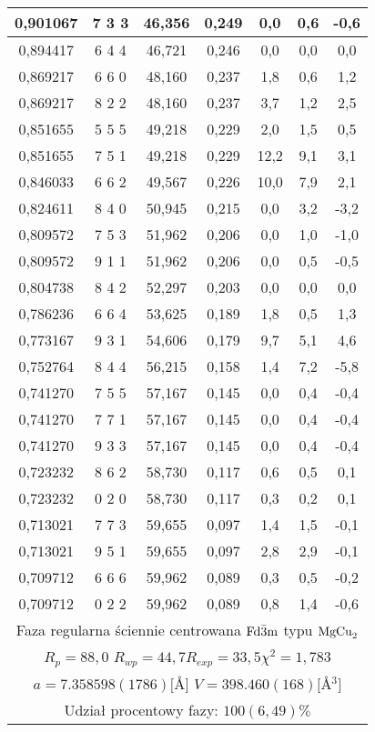 \documentclass[a4paper,12pt]{article}
\numberwithin{equation}{section}
\newcommand{\nit}[1]{\textnormal{#1}}
\begin{document}
\begin{appendices}
\begin{longtable}[c]{|c|c|c|c|c|c|c|}
0,901067	&	7   3   3	&	46,356	&	0,249	&	0,0	&	0,6	&	-0,6	\\\hline
0,894417	&	6   4   4	&	46,721	&	0,246	&	0,0	&	0,0	&	0,0	\\\hline
0,869217	&	6   6   0	&	48,160	&	0,237	&	1,8	&	0,6	&	1,2	\\\hline
0,869217	&	8   2   2	&	48,160	&	0,237	&	3,7	&	1,2	&	2,5	\\\hline
0,851655	&	5   5   5	&	49,218	&	0,229	&	2,0	&	1,5	&	0,5	\\\hline
0,851655	&	7   5   1	&	49,218	&	0,229	&	12,2	&	9,1	&	3,1	\\\hline
0,846033	&	6   6   2	&	49,567	&	0,226	&	10,0	&	7,9	&	2,1	\\\hline
0,824611	&	8   4   0	&	50,945	&	0,215	&	0,0	&	3,2	&	-3,2	\\\hline
0,809572	&	7   5   3	&	51,962	&	0,206	&	0,0	&	1,0	&	-1,0	\\\hline
0,809572	&	9   1   1	&	51,962	&	0,206	&	0,0	&	0,5	&	-0,5	\\\hline
0,804738	&	8   4   2	&	52,297	&	0,203	&	0,0	&	0,0	&	0,0	\\\hline
0,786236	&	6   6   4	&	53,625	&	0,189	&	1,8	&	0,5	&	1,3	\\\hline
0,773167	&	9   3   1	&	54,606	&	0,179	&	9,7	&	5,1	&	4,6	\\\hline
0,752764	&	8   4   4	&	56,215	&	0,158	&	1,4	&	7,2	&	-5,8	\\\hline
0,741270	&	7   5   5	&	57,167	&	0,145	&	0,0	&	0,4	&	-0,4	\\\hline
0,741270	&	7   7   1	&	57,167	&	0,145	&	0,0	&	0,4	&	-0,4	\\\hline
0,741270	&	9   3   3	&	57,167	&	0,145	&	0,0	&	0,4	&	-0,4	\\\hline
0,723232	&	8   6   2	&	58,730	&	0,117	&	0,6	&	0,5	&	0,1	\\\hline
0,723232	&	0   2   0	&	58,730	&	0,117	&	0,3	&	0,2	&	0,1	\\\hline
0,713021	&	7   7   3	&	59,655	&	0,097	&	1,4	&	1,5	&	-0,1	\\\hline
0,713021	&	9   5   1	&	59,655	&	0,097	&	2,8	&	2,9	&	-0,1	\\\hline
0,709712	&	6   6   6	&	59,962	&	0,089	&	0,3	&	0,5	&	-0,2	\\\hline
0,709712	&	0   2   2	&	59,962	&	0,089	&	0,8	&	1,4	&	-0,6	\\\hline



    \multicolumn{7}{|c|}{ Faza regularna ściennie centrowana $\nit{Fd}\bar{3}\nit{m}$ typu $\nit{MgCu}_2$ }\\
    \multicolumn{7}{|c|}{ $R_p=88,0$ \hspace{0.4cm}$R_{wp}=44,7$\hspace{0.4cm}$R_{exp}=33,5$\hspace{0.4cm}$\chi^2=1,783$  }\\
    \multicolumn{7}{|c|}{ $a=7.358598(1786) [$\AA$]$ \hspace{0.4cm}$V=398.460(168)[$\AA$^3]$ }\\
    \multicolumn{7}{|c|}{ Udział procentowy fazy: $100(6,49)\%$ }\\\hline


\end{longtable}
\end{appendices}
\end{document}
